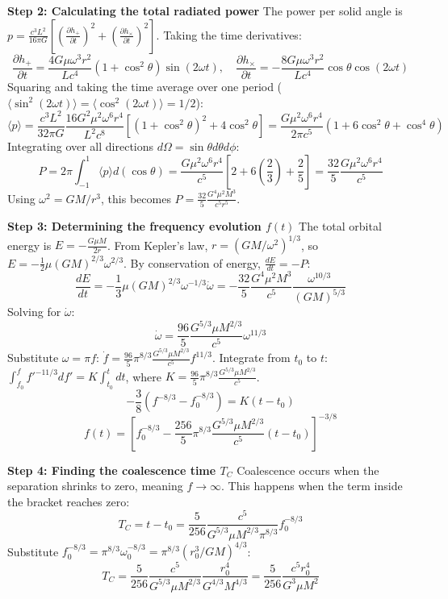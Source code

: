 \begin{solution}
\textbf{Step 2: Calculating the total radiated power}
The power per solid angle is $p = \frac{c^3 L^2}{16\pi G} \left[ \left(\frac{\partial h_+}{\partial t}\right)^2 + \left(\frac{\partial h_\times}{\partial t}\right)^2 \right]$.
Taking the time derivatives:
\[ \frac{\partial h_+}{\partial t} = \frac{4G\mu\omega^3 r^2}{L c^4} (1+\cos^2\theta) \sin(2\omega t), \quad \frac{\partial h_\times}{\partial t} = -\frac{8G\mu\omega^3 r^2}{L c^4} \cos\theta \cos(2\omega t) \]
Squaring and taking the time average over one period ($\langle\sin^2(2\omega t)\rangle = \langle\cos^2(2\omega t)\rangle = 1/2$):
\[ \langle p \rangle = \frac{c^3 L^2}{32\pi G} \frac{16 G^2 \mu^2 \omega^6 r^4}{L^2 c^8} \left[ (1+\cos^2\theta)^2 + 4\cos^2\theta \right] = \frac{G\mu^2\omega^6 r^4}{2\pi c^5} (1 + 6\cos^2\theta + \cos^4\theta) \]
Integrating over all directions $d\Omega = \sin\theta d\theta d\phi$:
\[ P = 2\pi \int_{-1}^1 \langle p \rangle d(\cos\theta) = \frac{G\mu^2\omega^6 r^4}{c^5} \left[ 2 + 6\left(\frac{2}{3}\right) + \frac{2}{5} \right] = \frac{32}{5} \frac{G\mu^2\omega^6 r^4}{c^5} \]
Using $\omega^2 = GM/r^3$, this becomes $P = \frac{32}{5} \frac{G^4 \mu^2 M^3}{c^5 r^5}$.

\textbf{Step 3: Determining the frequency evolution $f(t)$}
The total orbital energy is $E = -\frac{G\mu M}{2r}$. From Kepler's law, $r = (GM/\omega^2)^{1/3}$, so $E = -\frac{1}{2} \mu (GM)^{2/3} \omega^{2/3}$.
By conservation of energy, $\frac{dE}{dt} = -P$:
\[ \frac{dE}{dt} = -\frac{1}{3} \mu (GM)^{2/3} \omega^{-1/3} \dot{\omega} = -\frac{32}{5} \frac{G^4 \mu^2 M^3}{c^5} \frac{\omega^{10/3}}{(GM)^{5/3}} \]
Solving for $\dot{\omega}$:
\[ \dot{\omega} = \frac{96}{5} \frac{G^{5/3} \mu M^{2/3}}{c^5} \omega^{11/3} \]
Substitute $\omega = \pi f$: $\dot{f} = \frac{96}{5} \pi^{8/3} \frac{G^{5/3} \mu M^{2/3}}{c^5} f^{11/3}$.
Integrate from $t_0$ to $t$: $\int_{f_0}^{f} f'^{-11/3} df' = K \int_{t_0}^t dt$, where $K = \frac{96}{5} \pi^{8/3} \frac{G^{5/3} \mu M^{2/3}}{c^5}$.
\[ -\frac{3}{8} \left( f^{-8/3} - f_0^{-8/3} \right) = K (t - t_0) \]
\[ f(t) = \left[ f_0^{-8/3} - \frac{256}{5} \pi^{8/3} \frac{G^{5/3} \mu M^{2/3}}{c^5} (t - t_0) \right]^{-3/8} \]

\textbf{Step 4: Finding the coalescence time $T_C$}
Coalescence occurs when the separation shrinks to zero, meaning $f \to \infty$. This happens when the term inside the bracket reaches zero:
\[ T_C = t - t_0 = \frac{5}{256} \frac{c^5}{G^{5/3} \mu M^{2/3} \pi^{8/3}} f_0^{-8/3} \]
Substitute $f_0^{-8/3} = \pi^{8/3} \omega_0^{-8/3} = \pi^{8/3} (r_0^3/GM)^{4/3}$:
\[ T_C = \frac{5}{256} \frac{c^5}{G^{5/3} \mu M^{2/3}} \frac{r_0^4}{G^{4/3} M^{4/3}} = \frac{5}{256} \frac{c^5 r_0^4}{G^3 \mu M^2} \]


\end{solution}
